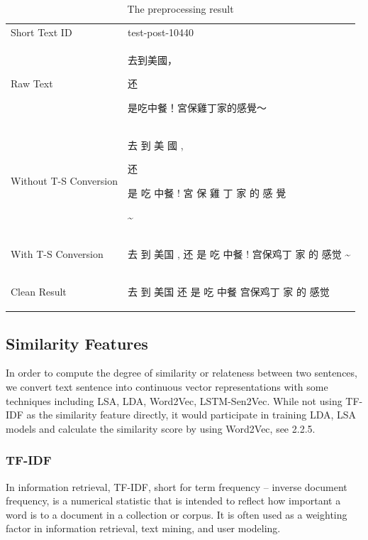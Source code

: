 \documentclass{sig-alternate}
\begin{document}
\begin{table}
\centering
\caption{The preprocessing result}
\begin{tabular}{l@{\qquad}l}
\hline\noalign{\smallskip}
Short Text ID & test-post-10440 \\
\noalign{\smallskip}
\hline
\noalign{\smallskip}
Raw Text          & \begin{CJK}{UTF8}{bsmi}去到美國，\begin{CJK}{UTF8}{gbsn}还\end{CJK}是吃中餐！宮保雞丁家的感覺～\end{CJK}  \\
\hline
\noalign{\smallskip}
Without T-S Conversion  & \begin{CJK}{UTF8}{bsmi}去 到 美 國 , \begin{CJK}{UTF8}{gbsn}还\end{CJK} 是 吃 中餐 ! 宮 保 雞 丁 家 的 感 覺 \end{CJK} \~{} \\
\hline
\noalign{\smallskip}
With T-S Conversion   & \begin{CJK}{UTF8}{gbsn}去 到 美国 , 还 是 吃 中餐 ! 宫保鸡丁 家 的 感觉 \~{}\end{CJK}   \\
\hline
\noalign{\smallskip}
Clean Result   & \begin{CJK}{UTF8}{gbsn}去 到 美国 还 是 吃 中餐 宫保鸡丁 家 的 感觉\end{CJK}   \\
\hline
\end{tabular}
\end{table}


\subsection{Similarity Features}
In order to compute the degree of similarity or relateness between two 
sentences, we convert text sentence into continuous vector representations 
with some techniques including LSA, LDA, Word2Vec, LSTM-Sen2Vec. While not 
using TF-IDF as the similarity feature directly, it would participate in 
training LDA, LSA models and calculate the similarity score by using Word2Vec, see 2.2.5.

\subsubsection{TF-IDF}
In information retrieval, TF-IDF, short for term frequency – inverse document frequency, is a numerical statistic that is intended to reflect how important a word is to a document in a collection or corpus. It is often used as a weighting factor in information retrieval, text mining, and user modeling. 
\end{document}
